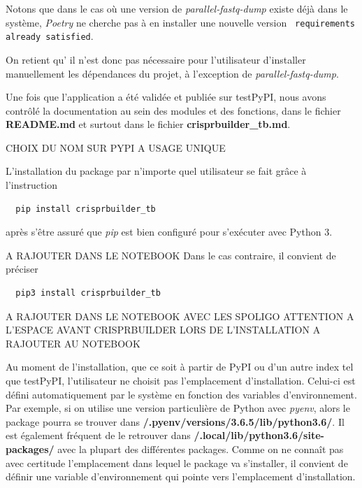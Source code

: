 \documentclass[twoside,a4paper,11pt,frenchb,openany]{report}
\begin{document}
Notons que dans le cas où une version de \textit{parallel-fastq-dump} existe déjà dans le système, \textit{Poetry} ne cherche pas à en installer une nouvelle version \texttt{  requirements already satisfied}.

On retient qu' il n'est donc pas nécessaire pour l'utilisateur d'installer manuellement les dépendances du projet, à l'exception de \textit{parallel-fastq-dump}. 










Une fois que l'application a été validée et publiée sur testPyPI, nous avons contrôlé la documentation au sein des modules et des fonctions, dans le fichier \textbf{README.md} et surtout dans le fichier \textbf{crisprbuilder\_tb.md}. 




CHOIX DU NOM SUR PYPI A USAGE UNIQUE

L’installation du package par n'importe quel utilisateur se fait grâce à l’instruction
\begin{verbatim}  pip install crisprbuilder_tb\end{verbatim}
après s'être assuré que \textit{pip} est bien configuré pour s'exécuter avec Python 3.


A RAJOUTER DANS LE NOTEBOOK
Dans le cas contraire, il convient de préciser
\begin{verbatim}  pip3 install crisprbuilder_tb\end{verbatim}



A RAJOUTER DANS LE NOTEBOOK AVEC LES SPOLIGO
ATTENTION A L'ESPACE AVANT CRISPRBUILDER LORS DE L'INSTALLATION A RAJOUTER AU NOTEBOOK

Au moment de l'installation, que ce soit à partir de PyPI ou d'un autre index tel que
testPyPI, l'utilisateur ne choisit pas l'emplacement d'installation. Celui-ci est défini automatiquement par le système en fonction des variables d'environnement. Par exemple, si on utilise une version particulière de Python avec \textit{pyenv}, alors le package pourra se trouver dans \textbf{\raisebox{-1ex}{\textasciitilde}/.pyenv/versions/3.6.5/lib/python3.6/}. Il est également fréquent de le retrouver dans \textbf{\raisebox{-1ex}{\textasciitilde}/.local/lib/python3.6/site-packages/} avec la plupart des différentes packages. Comme on ne connaît pas avec certitude l'emplacement dans lequel le package va s'installer, il convient de définir une variable d'environnement qui pointe vers l'emplacement d'installation.
\end{document}
